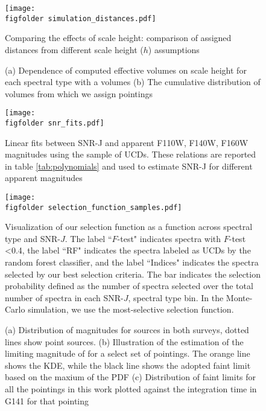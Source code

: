 \documentclass[manuscript]{aastex63}
\begin{document}
\begin{figure}
    \centering
    \texttt{[image: \\figfolder simulation\_distances.pdf]}
    \caption{Comparing the effects of scale height: comparison of assigned distances from different scale height ($h$) assumptions }
    
    \label{fig:simdists}
\end{figure}

\centering


\begin{figure}
\centering
{}
\caption{(a) Dependence of computed effective volumes on scale height for each spectral type with a volumes (b) The cumulative distribution of volumes from which we assign pointings }
\label{fig:simvls}
\end{figure}



\begin{figure}
    \centering
    \texttt{[image: \\figfolder snr\_fits.pdf]}
    \caption{Linear fits between SNR-J and apparent F110W, F140W, F160W magnitudes using the sample of UCDs. These relations are reported in table \ref{tab:polynomials} and used to estimate SNR-J for different apparent magnitudes}
    \label{fig:snrfits}
\end{figure}

\begin{figure}
    \centering
    \texttt{[image: \\figfolder selection\_function\_samples.pdf]}
    \caption{Visualization of our selection function as a function across spectral type and SNR-$J$. The label ``$F$-test" indicates spectra with $F$-test \textless 0.4, the label ``RF" indicates the spectra labeled as UCDs by the random forest classifier, and the label ``Indices" indicates the spectra selected by our best selection criteria. The bar indicates the selection probability defined as the number of spectra selected over the total number of spectra in each SNR-$J$, spectral type bin. In the Monte-Carlo simulation, we use the most-selective selection function. }
    \label{fig:selectionf}
\end{figure}




\begin{figure}
    \centering
    \caption{ (a) Distribution of magnitudes for sources in both surveys, dotted lines show point sources. (b) Illustration of the estimation of the limiting magnitude of for a select set of pointings. The orange line shows the KDE, while the black line shows the adopted faint limit based on the maxium of the PDF 
    (c) Distribution of faint limits for all the pointings in this work plotted against the integration time in G141 for that pointing}
    \label{fig:maglimit}
\end{figure}
\end{document}
